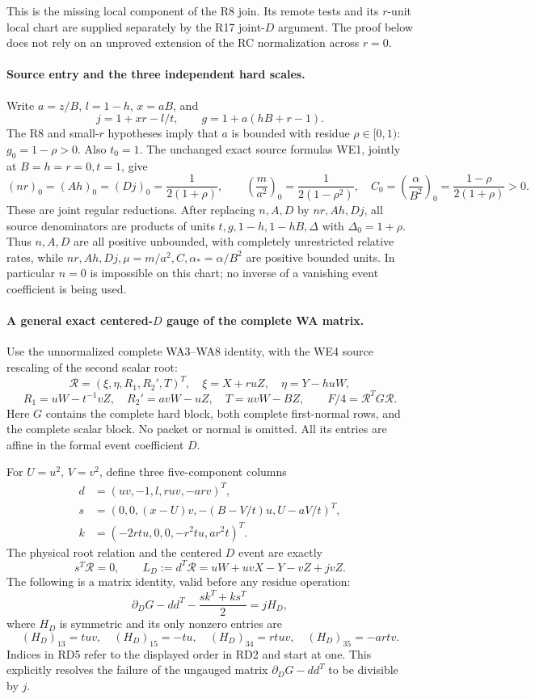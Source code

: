 This is the missing local component of the R8 join. Its remote tests
and its $r$-unit local chart are supplied separately by the R17
joint-$D$ argument. The proof below does not rely on an unproved
extension of the RC normalization across $r=0$.

\paragraph{Source entry and the three independent hard scales.}
Write $a=z/B$, $l=1-h$, $x=aB$, and
\[
 j=1+xr-l/t,\qquad g=1+a(hB+r-1).
\]
The R8 and small-$r$ hypotheses imply that $a$ is bounded with residue
$\rho\in[0,1)$: $g_0=1-\rho>0$. Also $t_0=1$.
The unchanged exact source formulas WE1, jointly at $B=h=r=0,t=1$,
give
\[
 (nr)_0=(Ah)_0=(Dj)_0=\frac1{2(1+\rho)},\qquad
 \left(\frac{m}{a^2}\right)_0=\frac1{2(1-\rho^2)},
 \quad C_0=\left(\frac\alpha{B^2}\right)_0
       =\frac{1-\rho}{2(1+\rho)}>0.                 \tag{RD1}
\]
These are joint regular reductions. After replacing $n,A,D$ by
$nr,Ah,Dj$, all source denominators are products of units
$t,g,1-h,1-hB,\Delta$ with $\Delta_0=1+\rho$.
Thus $n,A,D$ are all positive unbounded, with completely unrestricted
relative rates, while $nr,Ah,Dj,\mu=m/a^2,C,\alpha_*=\alpha/B^2$
are positive bounded units. In particular $n=0$ is impossible on
this chart; no inverse of a vanishing event coefficient is being used.

\paragraph{A general exact centered-$D$ gauge of the complete WA matrix.}
Use the unnormalized complete WA3--WA8 identity, with the WE4 source
rescaling of the second scalar root:
\[
 \mathcal R=(\xi,\eta,R_1,R_2',T)^T,
 \quad \xi=X+ruZ,\quad\eta=Y-huW,
\]
\[
 R_1=uW-t^{-1}vZ,\quad R_2'=avW-uZ,\quad T=uvW-BZ,
 \qquad F/4=\mathcal R^TG\mathcal R.                \tag{RD2}
\]
Here $G$ contains the complete hard block, both complete first-normal
rows, and the complete scalar block. No packet or normal is omitted.
All its entries are affine in the formal event coefficient $D$.

For $U=u^2$, $V=v^2$, define three five-component columns
\begin{align*}
 d&=(uv,-1,l,ruv,-arv)^T,\\
 s&=(0,0,(x-U)v,-(B-V/t)u,U-aV/t)^T,\\
 k&=(-2rtu,0,0,-r^2tu,ar^2t)^T.
\end{align*}
The physical root relation and the centered $D$ event are exactly
\[
 s^T\mathcal R=0,\qquad
 L_D:=d^T\mathcal R
   =uW+uvX-Y-vZ+jvZ.                               \tag{RD3}
\]
The following is a matrix identity, valid before any residue operation:
\[
 \partial_DG-dd^T-\frac{sk^T+ks^T}{2}=jH_D,        \tag{RD4}
\]
where $H_D$ is symmetric and its only nonzero entries are
\[
 (H_D)_{13}=tuv,\quad (H_D)_{15}=-tu,\quad
 (H_D)_{34}=rtuv,\quad (H_D)_{35}=-artv.           \tag{RD5}
\]
Indices in RD5 refer to the displayed order in RD2 and start at one.
This explicitly resolves the failure of the ungauged matrix
$\partial_DG-dd^T$ to be divisible by $j$.

